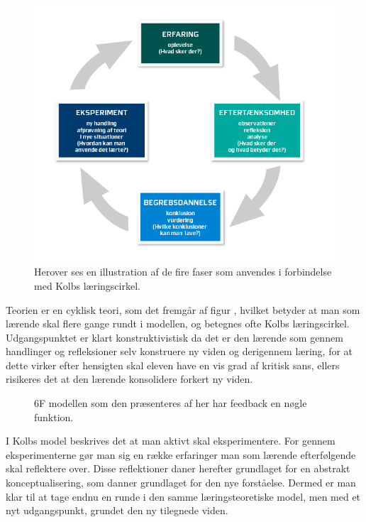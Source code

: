 \begin{figure}[h!]
	\centering
	\includegraphics[width=\textwidth]{Figs/kolb}
	\caption[Kolbs læringscirkel]{Herover ses en illustration af de fire faser som anvendes i forbindelse med Kolbs læringscirkel.}
	\label{fig:kolb}
\end{figure}

Teorien er en cyklisk teori, som det fremgår af figur , hvilket betyder at man som lærende skal flere gange rundt i modellen, og betegnes ofte Kolbs læringscirkel. Udgangspunktet er klart konstruktivistisk da det er den lærende som gennem handlinger og refleksioner selv konstruere ny viden og derigennem læring, for at dette virker efter hensigten skal eleven have en vis grad af kritisk sans, ellers risikeres det at den lærende konsolidere forkert ny viden. 

\begin{figure}
	\centering
	\vspace{-20pt}
	\caption[6F modellen]{6F modellen som den præsenteres af \citep{Dolin2014} her har feedback en nøgle funktion. }
	\label{fig:6F}
\vspace{-20pt}
\end{figure}
\noindent I Kolbs model beskrives det at man aktivt skal eksperimentere. For gennem eksperimenterne gør man sig en række erfaringer man som lærende efterfølgende skal reflektere over. Disse reflektioner daner herefter grundlaget for en abstrakt konceptualisering, som danner grundlaget for den nye forståelse. Dermed er man klar til at tage endnu en runde i den samme læringsteoretiske model, men med et nyt udgangspunkt, grundet den ny tilegnede viden. 

